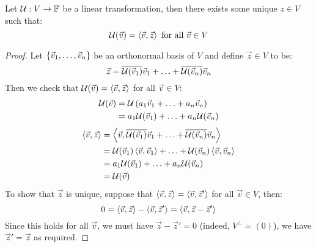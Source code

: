 \begin{lemma}\label{lininpform}
  Let $\mathcal{U} : V \to \mathbb{F}$ be a linear transformation,
  then there exists some unique $z \in V$ such that:
    $$\mathcal{U}(\vec v) = \left\langle \vec v , \vec z \right\rangle \text{ for all } \vec v \in V$$
\end{lemma}
\begin{proof}
  Let $\left\{\vec v_1, \ldots, \vec v_n\right\}$ be an orthonormal basis of $V$ and define $\vec z \in V$ to be:
    $$\vec z = \overline{\mathcal{U}(\vec v_1)}\vec v_1 + \ldots + \overline{\mathcal{U}(\vec v_n)}\vec v_n$$
  Then we check that $\mathcal{U}(\vec v) = \left\langle \vec v , \vec z \right\rangle$ for all $\vec v \in V$:
  \begin{align}
    \mathcal{U}(\vec v) &= \mathcal{U}\left(a_1\vec v_1 + \ldots + a_n \vec v_n\right) \\
                &= a_1\mathcal{U}(\vec v_1) + \ldots + a_n\mathcal{U}(\vec v_n)
  \end{align}
  \begin{align}
    \left\langle \vec v , \vec z \right\rangle &= \left\langle \vec v , \overline{\mathcal{U}(\vec v_1)}\vec v_1 + \ldots + \overline{\mathcal{U}(\vec v_n)}\vec v_n \right\rangle \\
                         &= \mathcal{U}(\vec v_1)\left\langle \vec v , \vec v_1 \right\rangle + \ldots + \mathcal{U}(\vec v_n)\left\langle \vec v , \vec v_n \right\rangle \\
                         &= a_1 \mathcal{U}(\vec v_1) + \ldots + a_n \mathcal{U}(\vec v_n) \\
                         &= \mathcal{U}(\vec v)
  \end{align}
  To show that $\vec z$ is unique, suppose that $\left\langle \vec v , \vec z \right\rangle = \left\langle \vec v , \vec z' \right\rangle$ for all $\vec v \in V$, then:
  $$0 = \left\langle \vec v , \vec z \right\rangle - \left\langle \vec v , \vec z' \right\rangle = \left\langle \vec v , \vec z - \vec z' \right\rangle$$
  Since this holds for all $\vec v$, we must have $\vec z - \vec z' = 0$ (indeed, $V^\perp = (0)$), we have $\vec z' = \vec z$ as required.
\end{proof}

